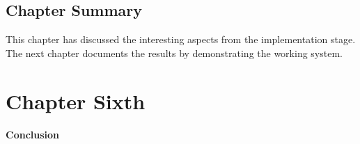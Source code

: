 \documentclass[12pt,a4paper]{article}
\begin{document}
\begin{comment}
	 	12. ALTER TABLE `ClientOrderList` ADD `UserName` VARCHAR(255) NOT NULL AFTER `col_price`;

	 	13. CREATE TABLE RankList (
		rl_id TINYINT UNSIGNED NOT NULL AUTO_INCREMENT,
		rl_name varchar(255),
		rl_score int,
		rl_comments varchar(255),
		PRIMARY KEY (rl_id)
		)ENGINE=InnoDB DEFAULT CHARSET=utf8;
		
	 	14. ALTER TABLE `Registration` ADD `reward_point` float(10, 2) NOT NULL AFTER `status`;
		
\end{lstlisting}
	
	\subsection{Code Documentation}
	Code documentation is an important part of any software engineering project. Throughout the im-
plementation, a JavaDoc tool was used to generate HTML API documentation of the project. The
JavaDoc could then be used to provide assistance to any future developer.

	\subsection{Version Control}
	Due to the type of development methodology used for this project, incremental backups of the system
were required. Version control systems (also known as Revision control) such as Mercurial manage
the changes to documents storing each backup in its own revision with the ability to restore back to a
particular version in the event of debugging.
	
	\end{comment}	

	\subsection{Chapter Summary}
	This chapter has discussed the interesting aspects from the implementation stage. The next chapter
documents the results by demonstrating the working system.
	
	\newpage	
	\section{Chapter Sixth}
	{\bfseries \Large Conclusion}
\end{document}
